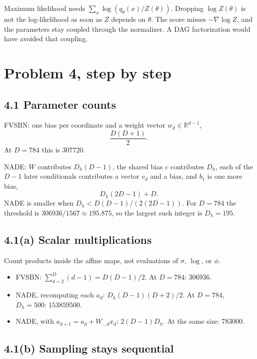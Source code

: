 \documentclass[11pt]{article}
\theoremstyle{remark}
\newcommand{\R}{\mathbb{R}}
\begin{document}
Maximum likelihood needs \(\sum_x\log(q_\theta(x)/Z(\theta))\). Dropping \(\log Z(\theta)\) is not the log-likelihood as soon as \(Z\) depends on \(\theta\). The score misses \(-\nabla\log Z\), and the parameters stay coupled through the normalizer. A DAG factorization would have avoided that coupling.

\newpage
\section{Problem 4, step by step}

\subsection*{4.1 Parameter counts}

FVSBN: one bias per coordinate and a weight vector \(w_d\in\R^{d-1}\),
\[
\frac{D(D+1)}{2}.
\]
At \(D=784\) this is \(307720\).

NADE: \(W\) contributes \(D_h(D-1)\), the shared bias \(c\) contributes \(D_h\), each of the \(D-1\) later conditionals contributes a vector \(v_d\) and a bias, and \(b_1\) is one more bias,
\[
D_h(2D-1)+D.
\]
NADE is smaller when \(D_h<D(D-1)/(2(2D-1))\). For \(D=784\) the threshold is \(306936/1567\approx 195.875\), so the largest such integer is \(D_h=195\).

\subsection*{4.1(a) Scalar multiplications}

Count products inside the affine maps, not evaluations of \(\sigma\), \(\log\), or \(\phi\).
\begin{itemize}
\item FVSBN: \(\sum_{d=2}^D(d-1)=D(D-1)/2\). At \(D=784\): \(306936\).
\item NADE, recomputing each \(a_d\): \(D_h(D-1)(D+2)/2\). At \(D=784\), \(D_h=500\): \(153859500\).
\item NADE, with \(a_{d+1}=a_d+W_{:,d}x_d\): \(2(D-1)D_h\). At the same size: \(783000\).
\end{itemize}

\subsection*{4.1(b) Sampling stays sequential}
\end{document}
